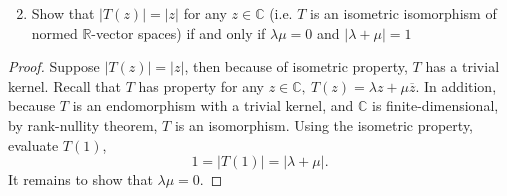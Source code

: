 \documentclass{article}
\theoremstyle{definition}
\numberwithin{lemma}{problem}
\numberwithin{equation}{problem}
\newcommand{\R}{\mathbb{R}}
\newcommand{\C}{\mathbb{C}}
\newcommand{\conj}[1]{\overline{#1}}
\newcommand{\abs}[1]{\left\lvert #1\right\rvert}
\begin{document}
\newpage
\begin{enumerate}[label=(\alph*)] \setcounter{enumi}{1}
    \item Show that $\abs{T(z)} = \abs{z}$ for any $z\in \C$
        (i.e. $T$ is an isometric isomorphism of normed $\R$-vector spaces)
        if and only if $\lambda \mu = 0$ and $\abs{\lambda + \mu} = 1$
\end{enumerate}
\begin{proof}
    Suppose $\abs{T(z)} = \abs{z}$,
    then because of isometric property, $T$ has a trivial kernel.
    Recall that $T$ has property for any $z\in \C,~ T(z) = \lambda z + \mu\conj{z}$.
    In addition, because $T$ is an endomorphism with a trivial kernel, and $\C$ is finite-dimensional,
    by rank-nullity theorem, $T$ is an isomorphism.
    Using the isometric property, evaluate $T(1)$,
    $$ 1 = \abs{T(1)} = \abs{\lambda + \mu}. $$
    It remains to show that $\lambda\mu = 0$.


\end{proof}
\end{document}
